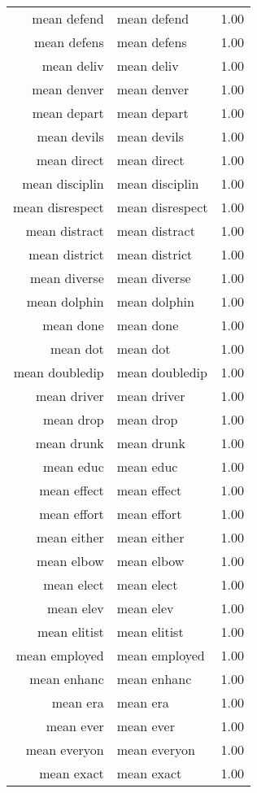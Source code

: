 \begin{table}[ht]
\begin{tabular}{rlr}
  mean defend & mean defend & 1.00 \\ 
  mean defens & mean defens & 1.00 \\ 
  mean deliv & mean deliv & 1.00 \\ 
  mean denver & mean denver & 1.00 \\ 
  mean depart & mean depart & 1.00 \\ 
  mean devils & mean devils & 1.00 \\ 
  mean direct & mean direct & 1.00 \\ 
  mean disciplin & mean disciplin & 1.00 \\ 
  mean disrespect & mean disrespect & 1.00 \\ 
  mean distract & mean distract & 1.00 \\ 
  mean district & mean district & 1.00 \\ 
  mean diverse & mean diverse & 1.00 \\ 
  mean dolphin & mean dolphin & 1.00 \\ 
  mean done & mean done & 1.00 \\ 
  mean dot & mean dot & 1.00 \\ 
  mean doubledip & mean doubledip & 1.00 \\ 
  mean driver & mean driver & 1.00 \\ 
  mean drop & mean drop & 1.00 \\ 
  mean drunk & mean drunk & 1.00 \\ 
  mean educ & mean educ & 1.00 \\ 
  mean effect & mean effect & 1.00 \\ 
  mean effort & mean effort & 1.00 \\ 
  mean either & mean either & 1.00 \\ 
  mean elbow & mean elbow & 1.00 \\ 
  mean elect & mean elect & 1.00 \\ 
  mean elev & mean elev & 1.00 \\ 
  mean elitist & mean elitist & 1.00 \\ 
  mean employed & mean employed & 1.00 \\ 
  mean enhanc & mean enhanc & 1.00 \\ 
  mean era & mean era & 1.00 \\ 
  mean ever & mean ever & 1.00 \\ 
  mean everyon & mean everyon & 1.00 \\ 
  mean exact & mean exact & 1.00 \\ 

\end{tabular}
\end{table}
